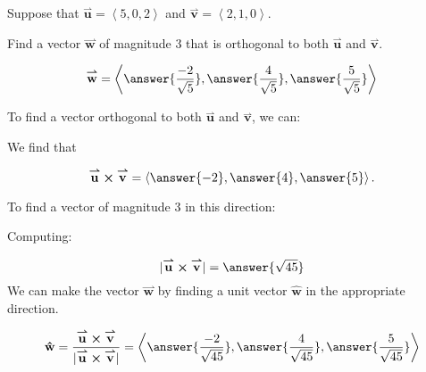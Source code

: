 \documentclass{ximera}
\author{Jim Talamo}
\begin{document}
\begin{exercise}
Suppose that $\overset{\boldsymbol{\rightharpoonup}}{\mathbf{u}} = \left< 5,0,2 \right>$ and $\overset{\boldsymbol{\rightharpoonup}}{\mathbf{v}} = \left< 2,1,0 \right>$.  

Find a vector $\overset{\boldsymbol{\rightharpoonup}}{\mathbf{w}}$ of magnitude 3 that is orthogonal to both $\overset{\boldsymbol{\rightharpoonup}}{\mathbf{u}}$ and $\overset{\boldsymbol{\rightharpoonup}}{\mathbf{v}}$.

\[
\overset{\boldsymbol{\rightharpoonup}}{\mathbf{w}} = \left< \answer{\frac{-2}{\sqrt{5}}},\answer{\frac{4}{\sqrt{5}}}, \answer{\frac{5}{\sqrt{5}}} \right>
\]


\begin{hint}
To find a vector orthogonal to both $\overset{\boldsymbol{\rightharpoonup}}{\mathbf{u}}$ and $\overset{\boldsymbol{\rightharpoonup}}{\mathbf{v}}$, we can:

\begin{multipleChoice}
\end{multipleChoice}

We find that

\[
\overset{\boldsymbol{\rightharpoonup}}{\mathbf{u}} \boldsymbol\times \overset{\boldsymbol{\rightharpoonup}}{\mathbf{v}} = \left< \answer{-2},\answer{4},\answer{5} \right>.
\]

To find a vector of magnitude 3 in this direction:

\begin{multipleChoice}
\end{multipleChoice}

Computing:

\[
|\overset{\boldsymbol{\rightharpoonup}}{\mathbf{u}} \boldsymbol\times \overset{\boldsymbol{\rightharpoonup}}{\mathbf{v}} | = \answer{\sqrt{45}}
\]
We can make the vector $\overset{\boldsymbol{\rightharpoonup}}{\mathbf{w}}$ by finding a unit vector $\mathbf{\hat{w}}$ in the appropriate direction.

\[
\mathbf{\hat{w}} = \frac{\overset{\boldsymbol{\rightharpoonup}}{\mathbf{u}} \boldsymbol\times \overset{\boldsymbol{\rightharpoonup}}{\mathbf{v}}}{|\overset{\boldsymbol{\rightharpoonup}}{\mathbf{u}} \boldsymbol\times \overset{\boldsymbol{\rightharpoonup}}{\mathbf{v}}|} = \left< \answer{\frac{-2}{\sqrt{45}}},\answer{\frac{4}{\sqrt{45}}}, \answer{\frac{5}{\sqrt{45}}} \right>
\]


\end{hint}
\end{exercise}
\end{document}

